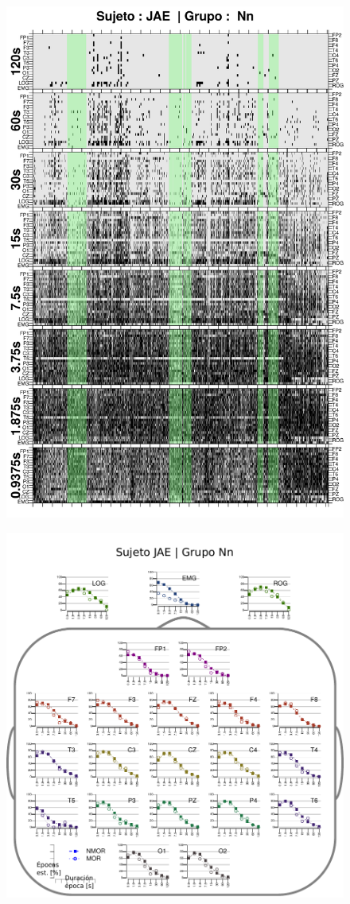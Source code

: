 \begin{figure}
\centering
\includegraphics[width=0.9\linewidth]
{./img_ejemplos/JANASUE_comp_est_.png} 
\end{figure}

\begin{figure}
\centering
\includegraphics[width=.9\linewidth]{./img_resultados/cabeza_JAE.pdf}
\end{figure}


